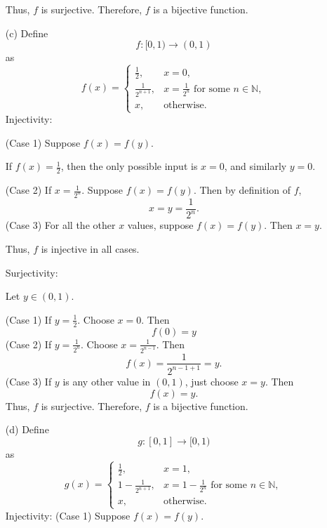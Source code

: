\documentclass[12pt]{article}
\begin{document}
\begin{enumerate}
            Thus, $f$ is surjective.
            Therefore, $f$ is a bijective function.
      \item [(c)]
            Define
            \[
                  f:[0,1)\to(0,1)
            \]
            as
            \[
                  f(x)=
                  \begin{cases}
                        \frac12,         & x=0,                                         \\
                        \frac1{2^{n+1}}, & x=\frac1{2^n}\text{ for some }n\in\mathbb N, \\
                        x,               & \text{otherwise}.
                  \end{cases}
            \]
            Injectivity:

            (Case 1) Suppose $f(x)=f(y)$.

            If $f(x)=\frac12$, then the only possible input is $x=0$,
            and similarly $y=0$.

            (Case 2) If $x = \frac{1}{2^n}$.
            Suppose $f(x) = f(y)$.
            Then by definition of $f$,
            \[
                  x = y = \frac{1}{2^n}.
            \]
            (Case 3) For all the other $x$ values, suppose $f(x) = f(y)$.
            Then $x = y$.

            Thus, $f$ is injective in all cases.

            Surjectivity:

            Let $y \in (0,1)$.

            (Case 1) If $y = \frac{1}{2}$. Choose $x = 0$. Then
            \[
                  f(0) = y
            \]
            (Case 2) If $y = \frac{1}{2^n}$. Choose $x = \frac{1}{2^{n-1}}$.
            Then
            \[
                  f(x) = \frac{1}{2^{n -1 + 1}} = y.
            \]
            (Case 3) If $y$ is any other value in $(0,1)$, just choose $x = y$.
            Then
            \[
                  f(x) = y.
            \]
            Thus, $f$ is surjective.
            Therefore, $f$ is a bijective function.

      \item [(d)]
            Define
            \[
                  g:[0,1] \to [0,1)
            \]
            as
            \[
                  g(x)=
                  \begin{cases}
                        \frac{1}{2},           & x = 1,                                                 \\
                        1 - \frac{1}{2^{n+1}}, & x = 1 - \frac{1}{2^n} \text{ for some } n\in\mathbb N, \\
                        x,                     & \text{otherwise}.
                  \end{cases}
            \]
            Injectivity:
            (Case 1) Suppose $f(x)=f(y)$.


\end{enumerate}
\end{document}
